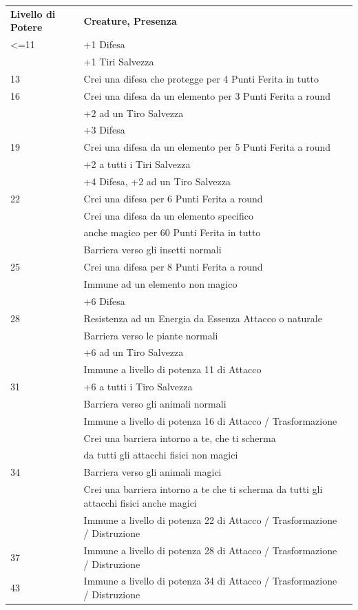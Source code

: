 \documentclass[a4paper,11pt,twoside,openany]{book}
\begin{document}
\bigskip
\begin{tabularx}{\textwidth}{lXl}
	\toprule
	\textbf{Livello di Potere} & \textbf{Creature, Presenza}\tabularnewline
	<=11     & +1 Difesa  \\
	         & +1 Tiri Salvezza \\
	13       & Crei una difesa che protegge per 4 Punti Ferita in tutto \\
	16       & Crei una difesa da un elemento per 3 Punti Ferita a round\\
             & +2 ad un Tiro Salvezza\\
             & +3 Difesa\\
	19       & Crei una difesa da un elemento per 5 Punti Ferita a round\\
             & +2 a tutti i Tiri Salvezza   \\
             & +4 Difesa, +2 ad un Tiro Salvezza \\
	22       & Crei una difesa per 6 Punti Ferita a round \\
             & Crei una difesa da un elemento specifico \\
             & anche magico per 60 Punti Ferita in tutto \\
             & Barriera verso gli insetti normali \\
	25       & Crei una difesa per 8 Punti Ferita a round \\
             & Immune ad un elemento non magico \\
             & +6 Difesa \\
	28       & Resistenza ad un Energia da Essenza Attacco o naturale \\
             & Barriera verso le piante normali\\
             & +6 ad un Tiro Salvezza\\
             & Immune a livello di potenza 11 di Attacco\\
	31       & +6 a tutti i Tiro Salvezza\\
             & Barriera verso gli animali normali\\
             & Immune a livello di potenza 16 di Attacco / Trasformazione\\
             & Crei una barriera intorno a te, che ti scherma\\
             & da tutti gli attacchi fisici non magici\\
	34       & Barriera verso gli animali magici\\
	         & Crei una barriera intorno a te che ti scherma da tutti gli attacchi fisici anche magici\\
             & Immune a livello di potenza 22 di Attacco / Trasformazione / Distruzione \\
	37       & Immune a livello di potenza 28 di Attacco / Trasformazione / Distruzione \\
	43       & Immune a livello di potenza 34 di Attacco / Trasformazione / Distruzione \\
\end{tabularx}
\end{document}
